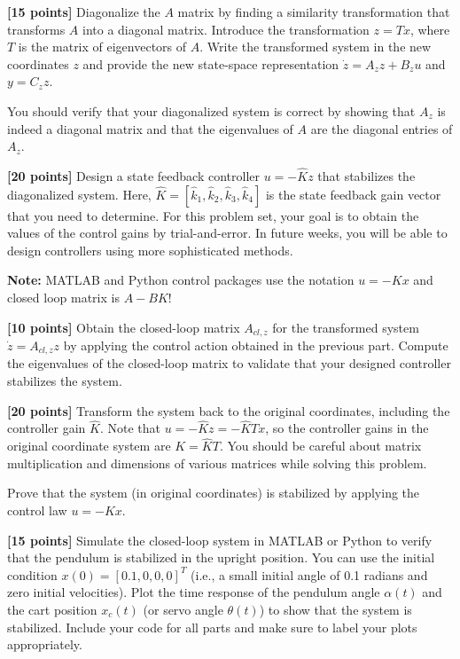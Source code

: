 \documentclass{ee122_pset}
\begin{document}
\problempart \textbf{[15 points]} Diagonalize the $A$ matrix by finding a similarity transformation that transforms $A$ into a diagonal matrix. Introduce the transformation $z = Tx$, where $T$ is the matrix of eigenvectors of $A$. Write the transformed system in the new coordinates $z$ and provide the new state-space representation $\dot z = A_z z + B_z u$ and $y = C_z z$.

You should verify that your diagonalized system is correct by showing that $A_z$ is indeed a diagonal matrix and that the eigenvalues of $A$ are the diagonal entries of $A_z$.

\problempart \textbf{[20 points]} Design a state feedback controller $u = -\hat{K}z$ that stabilizes the diagonalized system. Here, $\hat{K} = [\hat{k}_1, \hat{k}_2, \hat{k}_3, \hat{k}_4]$ is the state feedback gain vector that you need to determine. For this problem set, your goal is to obtain the values of the control gains by trial-and-error. In future weeks, you will be able to design controllers using more sophisticated methods.

\textbf{Note:} MATLAB and Python control packages use the notation $u = -Kx$ and closed loop matrix is $A - BK$!

\problempart \textbf{[10 points]} Obtain the closed-loop matrix $A_{cl, z}$ for the transformed system $\dot z = A_{cl, z} z$ by applying the control action obtained in the previous part. Compute the eigenvalues of the closed-loop matrix to validate that your designed controller stabilizes the system.

\problempart \textbf{[20 points]} Transform the system back to the original coordinates, including the controller gain $\hat{K}$. Note that $u = - \hat{K} z = -\hat{K}Tx$, so the controller gains in the original coordinate system are $K = \hat{K} T$. You should be careful about matrix multiplication and dimensions of various matrices while solving this problem. 

Prove that the system (in original coordinates) is stabilized by applying the control law $u = -K x$. 

\problempart \textbf{[15 points]} Simulate the closed-loop system in MATLAB or Python to verify that the pendulum is stabilized in the upright position. You can use the initial condition $x(0) = [0.1, 0, 0, 0]^T$ (i.e., a small initial angle of 0.1 radians and zero initial velocities). Plot the time response of the pendulum angle $\alpha(t)$ and the cart position $x_c(t)$ (or servo angle $\theta(t)$) to show that the system is stabilized. Include your code for all parts and make sure to label your plots appropriately. 
\end{document}
